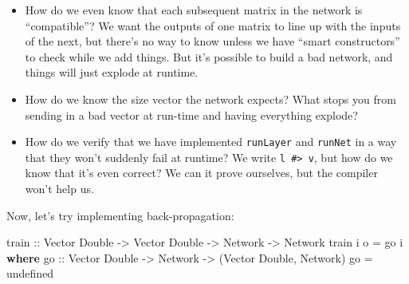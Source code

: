 \documentclass[]{article}
\newenvironment{Shaded}{}{}
\newcommand{\KeywordTok}[1]{\textcolor[rgb]{0.00,0.44,0.13}{\textbf{{#1}}}}
\newcommand{\DataTypeTok}[1]{\textcolor[rgb]{0.56,0.13,0.00}{{#1}}}
\newcommand{\OtherTok}[1]{\textcolor[rgb]{0.00,0.44,0.13}{{#1}}}
\newcommand{\FunctionTok}[1]{\textcolor[rgb]{0.02,0.16,0.49}{{#1}}}
\newcommand{\NormalTok}[1]{{#1}}
\begin{document}
\begin{itemize}
\item
  How do we even know that each subsequent matrix in the network is
  ``compatible''? We want the outputs of one matrix to line up with the
  inputs of the next, but there's no way to know unless we have ``smart
  constructors'' to check while we add things. But it's possible to
  build a bad network, and things will just explode at runtime.
\item
  How do we know the size vector the network expects? What stops you
  from sending in a bad vector at run-time and having everything
  explode?
\item
  How do we verify that we have implemented \texttt{runLayer} and
  \texttt{runNet} in a way that they won't suddenly fail at runtime? We
  write \texttt{l\ \#\textgreater{}\ v}, but how do we know that it's
  even correct? We can it prove ourselves, but the compiler won't help
  us.
\end{itemize}

Now, let's try implementing back-propagation:

\begin{Shaded}
\begin{Highlighting}[]
\OtherTok{train ::} \DataTypeTok{Vector} \DataTypeTok{Double} \OtherTok{->} \DataTypeTok{Vector} \DataTypeTok{Double} \OtherTok{->} \DataTypeTok{Network} \OtherTok{->} \DataTypeTok{Network}
\NormalTok{train i o }\FunctionTok{=} \NormalTok{go i}
  \KeywordTok{where}
\OtherTok{    go ::} \DataTypeTok{Vector} \DataTypeTok{Double} \OtherTok{->} \DataTypeTok{Network} \OtherTok{->} \NormalTok{(}\DataTypeTok{Vector} \DataTypeTok{Double}\NormalTok{, }\DataTypeTok{Network}\NormalTok{)}
    \NormalTok{go }\FunctionTok{=} \NormalTok{undefined}
\end{Highlighting}
\end{Shaded}
\end{document}
